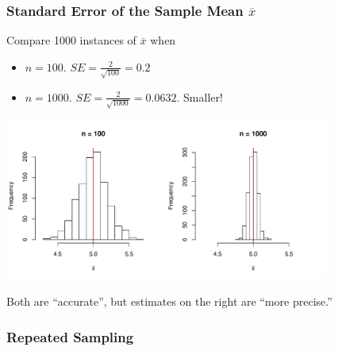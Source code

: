 \documentclass[handout]{beamer}
\newcommand{\blue}[1]{\textcolor{blue2}{#1}}
\newcommand{\xbar}{\overline{x}}
\begin{document}
%
\begin{frame}[fragile]
\frametitle{Standard Error of the Sample Mean $\xbar$}
Compare 1000 instances of $\xbar$ when 
\begin{itemize}
\pause \item $n=100$. $SE = \frac{2}{\sqrt{100}} = 0.2$
\pause \item $n=1000$. $SE = \frac{2}{\sqrt{1000}} = 0.0632$.  \blue{Smaller}!
\end{itemize}

\begin{center}
\pause \includegraphics[width=0.8\textwidth]{figure/compare}
\end{center}
\pause Both are ``accurate'', but estimates on the right are ``more precise.''

\end{frame}


\begin{frame}[fragile]
\frametitle{Repeated Sampling}
%
%
%
%
%
%

\end{frame}
\end{document}
